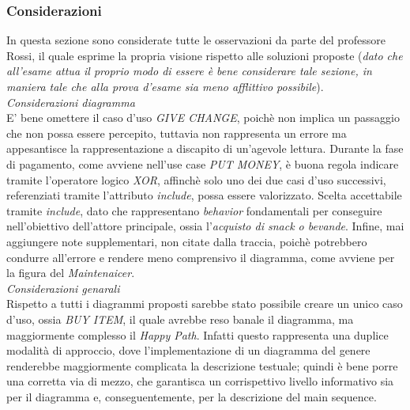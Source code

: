 \documentclass{article}
\begin{document}
\subsubsection*{Considerazioni}
In questa sezione sono considerate tutte le osservazioni da parte del professore Rossi, il quale esprime la propria visione rispetto
alle soluzioni proposte (\textit{dato che all'esame attua il proprio modo di essere è bene considerare tale sezione, in maniera tale che alla prova d'esame sia meno afflittivo possibile}).\vspace*{14pt}\\
\textit{Considerazioni diagramma}\\
E' bene omettere il caso d'uso \textit{GIVE CHANGE}, poichè non implica un passaggio che non possa essere percepito, tuttavia non rappresenta un errore ma appesantisce la rappresentazione a discapito di un'agevole lettura.
Durante la fase di pagamento, come avviene nell'use case \textit{PUT MONEY}, è buona regola indicare tramite l'operatore logico \textit{XOR}, affinchè solo uno dei due casi d'uso successivi, referenziati tramite l'attributo \textit{include}, possa essere valorizzato.
Scelta accettabile tramite \textit{include}, dato che rappresentano \textit{behavior} fondamentali per conseguire nell'obiettivo dell'attore principale, ossia l'\textit{acquisto di snack o bevande}. Infine, mai aggiungere note supplementari, non citate dalla traccia, poichè potrebbero condurre all'errore e rendere meno comprensivo il diagramma, come avviene per la figura del \textit{Maintenaicer}.\vspace{14pt}\\
\textit{Considerazioni genarali}\\
Rispetto a tutti i diagrammi proposti sarebbe stato possibile creare un unico caso d'uso, ossia \textit{BUY ITEM}, il quale avrebbe reso banale il diagramma, ma maggiormente complesso il \textit{Happy Path}. Infatti questo rappresenta una duplice modalità di approccio, dove l'implementazione di un diagramma del genere renderebbe maggiormente complicata la descrizione testuale; quindi è bene porre una corretta via di mezzo, che garantisca un corrispettivo livello informativo sia per il diagramma e, conseguentemente, per la descrizione del main sequence.
\end{document}
